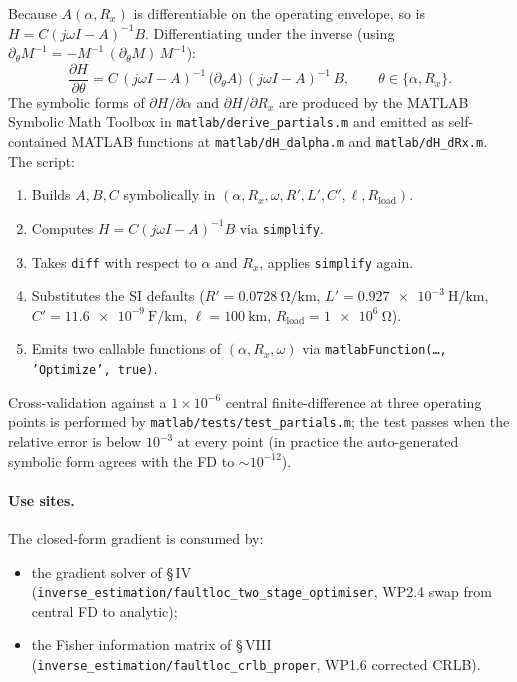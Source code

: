 \documentclass[11pt,a4paper]{article}
\begin{document}
Because $A(\alpha, R_x)$ is differentiable on the operating envelope,
so is $H = C(j\omega I - A)^{-1} B$.  Differentiating
under the inverse (using $\partial_\theta M^{-1} =
-M^{-1}\,(\partial_\theta M)\,M^{-1}$):
\begin{equation}
  \frac{\partial H}{\partial\theta}
     = C\,(j\omega I - A)^{-1}\,\Big(\partial_\theta A\Big)\,
       (j\omega I - A)^{-1}\,B,
  \qquad \theta \in \{\alpha, R_x\}.
  \label{eq:dHdtheta}
\end{equation}
The symbolic forms of $\partial H/\partial\alpha$ and
$\partial H/\partial R_x$ are produced by the MATLAB Symbolic Math
Toolbox in \texttt{matlab/derive\_partials.m} and emitted as
self-contained MATLAB functions at \texttt{matlab/dH\_dalpha.m} and
\texttt{matlab/dH\_dRx.m}.  The script:
\begin{enumerate}[leftmargin=2em]
  \item Builds $A, B, C$ symbolically in
        $(\alpha, R_x, \omega, R', L', C', \ell, R_{\text{load}})$.
  \item Computes $H = C(j\omega I - A)^{-1} B$ via \texttt{simplify}.
  \item Takes \texttt{diff} with respect to $\alpha$ and $R_x$,
        applies \texttt{simplify} again.
  \item Substitutes the SI defaults
        ($R'=\SI{0.0728}{\ohm\per\km}$,
         $L'=\SI{0.927e-3}{\henry\per\km}$,
         $C'=\SI{11.6e-9}{\farad\per\km}$,
         $\ell=\SI{100}{\km}$,
         $R_{\text{load}}=\SI{1e6}{\ohm}$).
  \item Emits two callable functions of $(\alpha, R_x, \omega)$ via
        \texttt{matlabFunction(\dots, 'Optimize', true)}.
\end{enumerate}
Cross-validation against a $1\times 10^{-6}$ central finite-difference
at three operating points is performed by
\texttt{matlab/tests/test\_partials.m}; the test passes when the
relative error is below $10^{-3}$ at every point (in practice the
auto-generated symbolic form agrees with the FD to $\sim 10^{-12}$).

\paragraph{Use sites.}
The closed-form gradient is consumed by:
\begin{itemize}[leftmargin=2em]
  \item the gradient solver of \S\,IV
        (\texttt{inverse\_estimation/faultloc\_two\_stage\_optimiser},
        WP2.4 swap from central FD to analytic);
  \item the Fisher information matrix of \S\,VIII
        (\texttt{inverse\_estimation/faultloc\_crlb\_proper},
        WP1.6 corrected CRLB).
\end{itemize}
\end{document}
